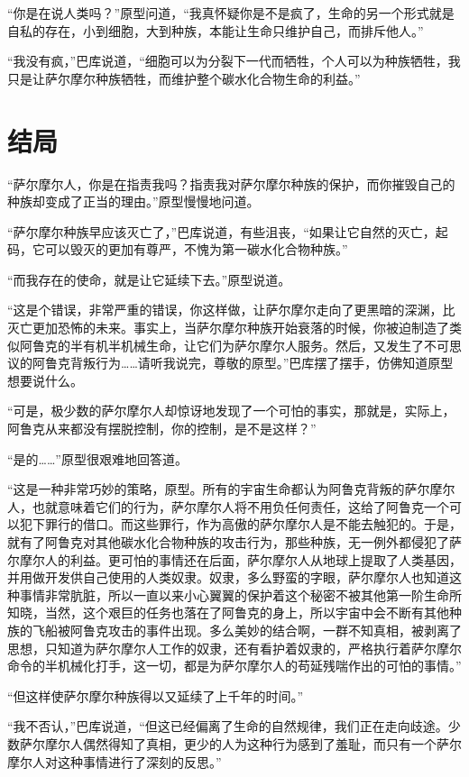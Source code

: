 “你是在说人类吗？”原型问道，“我真怀疑你是不是疯了，生命的另一个形式就是自私的存在，小到细胞，大到种族，本能让生命只维护自己，而排斥他人。” 

“我没有疯，”巴库说道，“细胞可以为分裂下一代而牺牲，个人可以为种族牺牲，我只是让萨尔摩尔种族牺牲，而维护整个碳水化合物生命的利益。” 

\chapter{结局}

“萨尔摩尔人，你是在指责我吗？指责我对萨尔摩尔种族的保护，而你摧毁自己的种族却变成了正当的理由。”原型慢慢地问道。 

“萨尔摩尔种族早应该灭亡了，”巴库说道，有些沮丧，“如果让它自然的灭亡，起码，它可以毁灭的更加有尊严，不愧为第一碳水化合物种族。” 

“而我存在的使命，就是让它延续下去。”原型说道。 

“这是个错误，非常严重的错误，你这样做，让萨尔摩尔走向了更黑暗的深渊，比灭亡更加恐怖的未来。事实上，当萨尔摩尔种族开始衰落的时候，你被迫制造了类似阿鲁克的半有机半机械生命，让它们为萨尔摩尔人服务。然后，又发生了不可思议的阿鲁克背叛行为……请听我说完，尊敬的原型。”巴库摆了摆手，仿佛知道原型想要说什么。 

“可是，极少数的萨尔摩尔人却惊讶地发现了一个可怕的事实，那就是，实际上，阿鲁克从来都没有摆脱控制，你的控制，是不是这样？” 

“是的……”原型很艰难地回答道。 

“这是一种非常巧妙的策略，原型。所有的宇宙生命都认为阿鲁克背叛的萨尔摩尔人，也就意味着它们的行为，萨尔摩尔人将不用负任何责任，这给了阿鲁克一个可以犯下罪行的借口。而这些罪行，作为高傲的萨尔摩尔人是不能去触犯的。于是，就有了阿鲁克对其他碳水化合物种族的攻击行为，那些种族，无一例外都侵犯了萨尔摩尔人的利益。更可怕的事情还在后面，萨尔摩尔人从地球上提取了人类基因，并用做开发供自己使用的人类奴隶。奴隶，多么野蛮的字眼，萨尔摩尔人也知道这种事情非常肮脏，所以一直以来小心翼翼的保护着这个秘密不被其他第一阶生命所知晓，当然，这个艰巨的任务也落在了阿鲁克的身上，所以宇宙中会不断有其他种族的飞船被阿鲁克攻击的事件出现。多么美妙的结合啊，一群不知真相，被剥离了思想，只知道为萨尔摩尔人工作的奴隶，还有看护着奴隶的，严格执行着萨尔摩尔命令的半机械化打手，这一切，都是为萨尔摩尔人的苟延残喘作出的可怕的事情。” 

“但这样使萨尔摩尔种族得以又延续了上千年的时间。” 

“我不否认，”巴库说道，“但这已经偏离了生命的自然规律，我们正在走向歧途。少数萨尔摩尔人偶然得知了真相，更少的人为这种行为感到了羞耻，而只有一个萨尔摩尔人对这种事情进行了深刻的反思。” 

